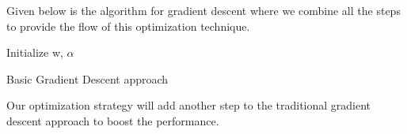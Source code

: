 \documentclass[review]{elsarticle}
\begin{document}
Given below is the algorithm for gradient descent where we combine all the steps to provide the flow of this optimization technique.
\begin{algorithm}[h!]
\SetAlgoLined
{}
 Initialize w, $\alpha$\;
 
 \caption{Basic Gradient Descent approach}
\end{algorithm}
Our optimization strategy will add another step to the traditional gradient descent approach to boost the performance.
\end{document}
